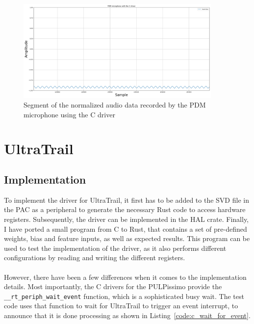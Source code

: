 \begin{figure}[H]
    \centering
    \includegraphics[width=0.9\textwidth]{figures/pdm/pdm_c.png}
    \caption[Segment of the normalized audio data recorded by the PDM microphone using the C driver]{Segment of the normalized audio data recorded by the PDM microphone using the C driver}
    \label{fig:pdm_c}
\end{figure}

\begin{minipage}{\textwidth}
\section{UltraTrail}

\subsection{Implementation}

To implement the driver for UltraTrail, it first has to be added to the SVD file in the PAC
as a peripheral to generate the necessary Rust code to access hardware registers.
Subsequently, the driver can be implemented in the HAL crate.
Finally, I have ported a small program from C to Rust, that contains a set of pre-defined
weights, bias and feature inputs, as well as expected results.
This program can be used to test the implementation of the driver, as it also
performs different configurations by reading and writing the different registers.
\\\\
However, there have been a few differences when it comes to the implementation details.
Most importantly, the C drivers for the PULPissimo provide the \lstinline{__rt_periph_wait_event} function,
which is a sophisticated busy wait.
The test code uses that function to wait for UltraTrail to trigger an event interrupt, to announce that
it is done processing as shown in Listing~\ref{code:c_wait_for_event}.
\end{minipage}

